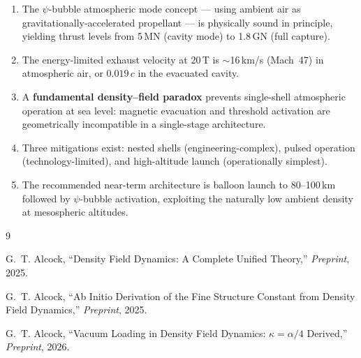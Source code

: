 \documentclass[12pt,twocolumn]{article}
\begin{document}
\begin{enumerate}
  \item The $\psi$-bubble atmospheric mode concept --- using ambient
        air as gravitationally-accelerated propellant --- is physically
        sound in principle, yielding thrust levels from 5\,MN (cavity
        mode) to 1.8\,GN (full capture).

  \item The energy-limited exhaust velocity at 20\,T is
        $\sim$16\,km/s (Mach~47) in atmospheric air, or $0.019\,c$
        in the evacuated cavity.

  \item A \textbf{fundamental density--field paradox} prevents
        single-shell atmospheric operation at sea level: magnetic
        evacuation and threshold activation are geometrically
        incompatible in a single-stage architecture.

  \item Three mitigations exist: nested shells (engineering-complex),
        pulsed operation (technology-limited), and high-altitude
        launch (operationally simplest).

  \item The recommended near-term architecture is balloon launch to
        80--100\,km followed by $\psi$-bubble activation, exploiting
        the naturally low ambient density at mesospheric altitudes.
\end{enumerate}

\begin{thebibliography}{9}

G.~T. Alcock, ``Density Field Dynamics: A Complete Unified Theory,''
\textit{Preprint}, 2025.

G.~T. Alcock, ``Ab Initio Derivation of the Fine Structure Constant
from Density Field Dynamics,'' \textit{Preprint}, 2025.

G.~T. Alcock, ``Vacuum Loading in Density Field Dynamics:
$\kappa = \alpha/4$ Derived,'' \textit{Preprint}, 2026.

\end{thebibliography}
\end{document}

